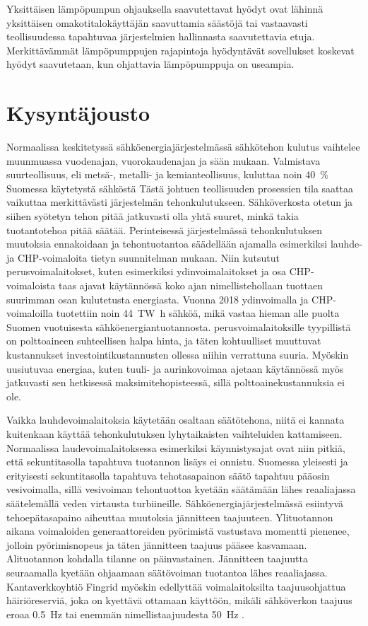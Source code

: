   Yksittäisen lämpöpumpun ohjauksella saavutettavat hyödyt ovat lähinnä yksittäisen omakotitalokäyttäjän saavuttamia säästöjä tai vastaavasti teollisuudessa tapahtuvaa järjestelmien hallinnasta saavutettavia etuja. Merkittävämmät lämpöpumppujen rajapintoja hyödyntävät sovellukset koskevat hyödyt saavutetaan, kun ohjattavia lämpöpumppuja on useampia.

\section{Kysyntäjousto}

  Normaalissa keskitetyssä sähköenergiajärjestelmässä sähkötehon kulutus vaihtelee muunmuassa vuodenajan, vuorokaudenajan ja sään mukaan. Valmistava suurteollisuus, eli metsä-, metalli- ja kemianteollisuus, kuluttaa noin \SI{40}{\percent} Suomessa käytetystä sähköstä Tästä johtuen teollisuuden prosessien tila saattaa vaikuttaa merkittävästi järjestelmän tehonkulutukseen\parencite{SVTehk}. Sähköverkosta otetun ja siihen syötetyn tehon pitää jatkuvasti olla yhtä suuret, minkä takia tuotantotehoa pitää säätää. Perinteisessä järjestelmässä tehonkulutuksen muutoksia ennakoidaan ja tehontuotantoa säädellään ajamalla esimerkiksi lauhde- ja \gls{CHP}-voimaloita tietyn suunnitelman mukaan.\parencite{energiateollisuus} Niin kutsutut perusvoimalaitokset, kuten esimerkiksi ydinvoimalaitokset ja osa \gls{CHP}-voimaloista taas ajavat käytännössä koko ajan nimellistehollaan tuottaen suurimman osan kulutetusta energiasta. Vuonna 2018 ydinvoimalla ja CHP-voimaloilla tuotettiin noin \SI{44}{\tera\watt\hour} sähköä, mikä vastaa hieman alle puolta Suomen vuotuisesta sähköenergiantuotannosta.\parencite{SVTSaLaTuo} perusvoimalaitoksille tyypillistä on polttoaineen suhteellisen halpa hinta, ja täten kohtuulliset muuttuvat kustannukset investointikustannusten ollessa niihin verrattuna suuria. Myöskin uusiutuvaa energiaa, kuten tuuli- ja aurinkovoimaa ajetaan käytännössä myös jatkuvasti sen hetkisessä maksimitehopisteessä, sillä polttoainekustannuksia ei ole.

  Vaikka lauhdevoimalaitoksia käytetään osaltaan säätötehona, niitä ei kannata kuitenkaan käyttää tehonkulutuksen lyhytaikaisten vaihteluiden kattamiseen. Normaalissa laudevoimalaitoksessa esimerkiksi käynnistysajat ovat niin pitkiä, että sekuntitasolla tapahtuva tuotannon lisäys ei onnistu.\parencite{VJV2018} Suomessa yleisesti ja erityisesti sekuntitasolla tapahtuva tehotasapainon säätö tapahtuu pääosin vesivoimalla\parencite{energiateollisuus}, sillä vesivoiman tehontuottoa kyetään säätämään lähes reaaliajassa säätelemällä veden virtausta turbiineille. Sähköenergiajärjestelmässä esiintyvä tehoepätasapaino aiheuttaa muutoksia jännitteen taajuuteen. Ylituotannon aikana voimaloiden generaattoreiden pyörimistä vastustava momentti pienenee, jolloin pyörimisnopeus ja täten jännitteen taajuus pääsee kasvamaan. Alituotannon kohdalla tilanne on päinvastainen. Jännitteen taajuutta seuraamalla kyetään ohjaamaan säätövoiman tuotantoa lähes reaaliajassa. Kantaverkkoyhtiö Fingrid myöskin edellyttää voimalaitoksilta taajuusohjattua häiriöreserviä, joka on kyettävä ottamaan käyttöön, mikäli sähköverkon taajuus eroaa \SI{0.5}{\hertz} tai enemmän nimellistaajuudesta \SI{50}{\hertz} \parencite{VJV2018}.

